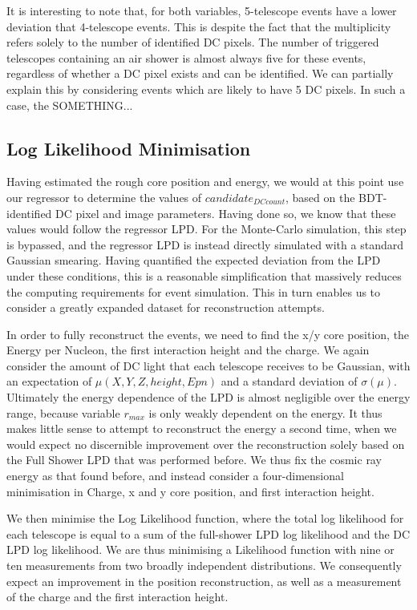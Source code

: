 \documentclass{article}
\begin{document}
It is interesting to note that, for both variables, 5-telescope events have a lower deviation that 4-telescope events. This is despite the fact that the multiplicity refers solely to the number of identified DC pixels. The number of triggered telescopes containing an air shower is almost always five for these events, regardless of whether a DC pixel exists and can be identified. We can partially explain this by considering events which are likely to have 5 DC pixels. In such a case, the SOMETHING...

\subsection{Log Likelihood Minimisation}
Having estimated the rough core position and energy, we would at this point use our regressor to determine the values of $candidate_{DCcount}$, based on the BDT-identified DC pixel and image parameters. Having done so, we know that these values would follow the regressor LPD. For the Monte-Carlo simulation, this step is bypassed, and the regressor LPD is instead directly simulated with a standard Gaussian smearing. Having quantified the expected deviation from the LPD under these conditions, this is a reasonable simplification that massively reduces the computing requirements for event simulation. This in turn enables us to consider a greatly expanded dataset for reconstruction attempts.
 
In order to fully reconstruct the events, we need to find the x/y core position, the Energy per Nucleon, the first interaction height and the charge. We again consider the amount of DC light that each telescope receives to be Gaussian, with an expectation of $\mu(X, Y, Z, height, Epn)$ and a standard deviation of $\sigma(\mu)$. Ultimately the energy dependence of the LPD is almost negligible over the energy range, because variable $r_{max}$ is only weakly dependent on the energy. It thus makes little sense to attempt to reconstruct the energy a second time, when we would expect no discernible improvement over the reconstruction solely based on the Full Shower LPD that was performed before. We thus fix the cosmic ray energy as that found before, and instead consider a four-dimensional minimisation in Charge, x and y core position, and first interaction height.

We then minimise the Log Likelihood function, where the total log likelihood for each telescope is equal to a sum of the full-shower LPD log likelihood and the DC LPD log likelihood. We are thus minimising a Likelihood function with nine or ten measurements from two broadly independent distributions. We consequently expect an improvement in the position reconstruction, as well as a measurement of the charge and the first interaction height.
\end{document}
